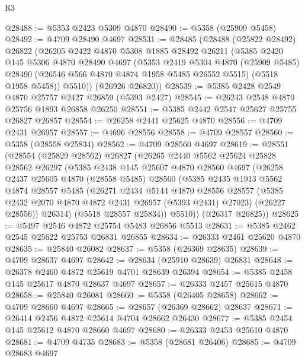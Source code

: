 \begin{lexlean}{R3}
\begin{coremodule}
@28488 := @5353 @2423 @5309 @4870
@28490 := @5358 (@25909 @5458)
@28492 := @4709 @28490 @4697
@28531 := @28485
    (@28488
      (@25822 @28492)
      @26822
      (@26205
        @2422
        @4870
        @5308
        @1885
        @28492
        @26211
        (@5385
          @2420
          @145
          @5306
          @4870
          @28490
          @4697
          (@5353
            @2419
            @5304
            @4870
            (@25909 @5485)
            @28490
            (@26546 @566 @4870 @4874 @1958 @5485 @26552 @5515)
            (@5518 @1958 @5458))
          @5510))
      (@26926 @26820))
@28539 := @5385 @2428 @2549 @4870 @25757 @2427 @26859 (@5393 @2427)
@28545 := @26243 @2548 @4870 @25756 @1893 @26858 @26250
@28551 := @5385 @2442 @2547 @25627 @25755 @26827 @26857
@28554 := @26258 @2441 @25625 @4870
@28556 := @4709 @2431 @26957
@28557 := @4696 @28556
@28558 := @4709 @28557
@28560 := @5358 (@28558 @25834)
@28562 := @4709 @28560 @4697
@28619 := @28551
    (@28554
      (@25829 @28562)
      @26827
      (@26265
        @2440
        @5562
        @25624
        @25828
        @28562
        @26297
        (@5385
          @2438
          @145
          @25607
          @4870
          @28560
          @4697
          (@26258
            @2437
            @25605
            @4870
            (@28558 @5485)
            @28560
            (@5385
              @2435
              @1913
              @5562
              @4874
              @28557
              @5485
              (@26271
                @2434
                @5144
                @4870
                @28556
                @28557
                (@5385 @2432 @2070 @4870 @4872 @2431 @26957 (@5393 @2431) @27023)
                (@26227 @28556))
              @26314)
            (@5518 @28557 @25834))
          @5510))
      (@26317 @26825))
@28625 := @5497 @2546 @4872 @25754 @5483 @26856 @5513
@28631 := @5385 @2462 @2545 @25622 @25753 @26831 @26855
@28634 := @26333 @2461 @25620 @4870
@28635 := @25840 @26082
@28637 := @5358 (@26369 @28635)
@28639 := @4709 @28637 @4697
@28642 := @28634 (@25910 @28639) @26831
@28648 := @26378 @2460 @4872 @25619 @4701 @28639 @26394
@28654 := @5385 @2458 @145 @25617 @4870 @28637 @4697
@28657 := @26333 @2457 @25615 @4870
@28658 := @25840 @26081
@28660 := @5358 (@26405 @28658)
@28662 := @4709 @28660 @4697
@28665 := @28657 (@26369 @28662) @28637
@28671 := @26414 @2456 @4872 @25614 @4704 @28662 @26430
@28677 := @5385 @2454 @145 @25612 @4870 @28660 @4697
@28680 := @26333 @2453 @25610 @4870
@28681 := @4709 @4735
@28683 := @5358 (@28681 @26406)
@28685 := @4709 @28683 @4697

\end{coremodule}
\end{lexlean}
